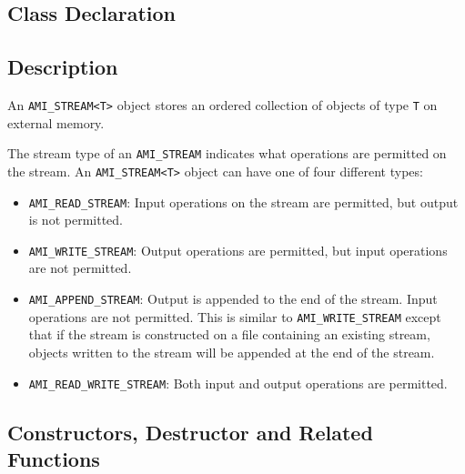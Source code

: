 \subsection{Class Declaration}
  \btabb
     {}
  \etabb

\subsection{Description}
An \lstinline|AMI_STREAM<T>| object stores an ordered collection of objects of
type \lstinline|T| on external memory.

The stream type of an \lstinline|AMI_STREAM| indicates what
operations are permitted on the stream.
An \lstinline|AMI_STREAM<T>| object can have one of four different
types:
\begin{itemize}
    
    \item \lstinline|AMI_READ_STREAM|: Input operations on
    the stream are permitted, but output is not permitted.
    
    \item \lstinline|AMI_WRITE_STREAM|: Output operations are
    permitted, but input operations are not permitted. 
    
    \item \lstinline|AMI_APPEND_STREAM|: Output is appended
    to the end of the stream. Input operations are not
    permitted. This is similar to
    \lstinline|AMI_WRITE_STREAM| except that if the stream is
    constructed on a file containing an existing stream,
    objects written to the stream will be appended at the
    end of the stream.

    \item \lstinline|AMI_READ_WRITE_STREAM|: Both input and output
    operations are permitted.
\end{itemize}


\subsection{Constructors, Destructor and Related Functions}


